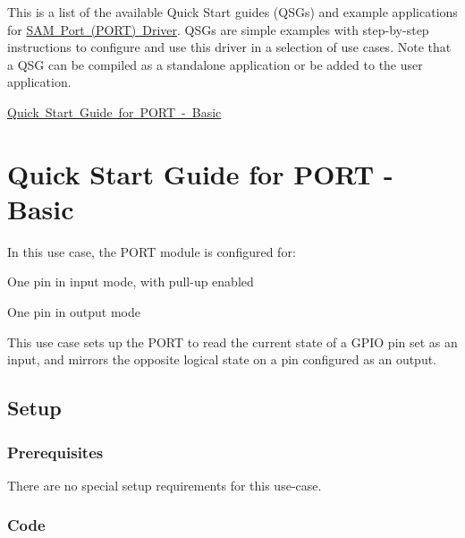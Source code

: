 This is a list of the available Quick Start guides (Q\+S\+Gs) and example applications for \mbox{\hyperlink{group__asfdoc__sam0__port__group}{S\+AM Port (P\+O\+RT) Driver}}. Q\+S\+Gs are simple examples with step-\/by-\/step instructions to configure and use this driver in a selection of use cases. Note that a Q\+SG can be compiled as a standalone application or be added to the user application.


\begin{DoxyItemize}
\item \mbox{\hyperlink{asfdoc_sam0_port_basic_use_case}{Quick Start Guide for P\+O\+RT -\/ Basic}} 
\end{DoxyItemize}\hypertarget{asfdoc_sam0_port_basic_use_case}{}\section{Quick Start Guide for P\+O\+RT -\/ Basic}\label{asfdoc_sam0_port_basic_use_case}
In this use case, the P\+O\+RT module is configured for\+: \begin{DoxyItemize}
\item One pin in input mode, with pull-\/up enabled \item One pin in output mode\end{DoxyItemize}
This use case sets up the P\+O\+RT to read the current state of a G\+P\+IO pin set as an input, and mirrors the opposite logical state on a pin configured as an output.\hypertarget{asfdoc_sam0_port_basic_use_case_asfdoc_sam0_port_basic_use_case_setup}{}\subsection{Setup}\label{asfdoc_sam0_port_basic_use_case_asfdoc_sam0_port_basic_use_case_setup}
\hypertarget{asfdoc_sam0_port_basic_use_case_asfdoc_sam0_port_basic_use_case_setup_prereq}{}\subsubsection{Prerequisites}\label{asfdoc_sam0_port_basic_use_case_asfdoc_sam0_port_basic_use_case_setup_prereq}
There are no special setup requirements for this use-\/case.\hypertarget{asfdoc_sam0_port_basic_use_case_asfdoc_sam0_port_basic_use_case_setup_code}{}\subsubsection{Code}\label{asfdoc_sam0_port_basic_use_case_asfdoc_sam0_port_basic_use_case_setup_code}
